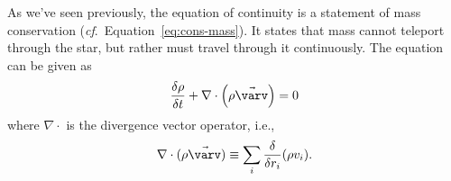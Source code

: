 \begin{description}
    \setlength{\itemindent}{0pt}
    \item[The continuity equation.]
    As we've seen previously, the equation of continuity is a statement of mass conservation (\emph{cf}.~Equation~\ref{eq:cons-mass}). 
    It states that mass cannot teleport through the star, but rather must travel through it continuously. 
    The equation can be given as 
    \begin{equation} \label{eq:continuity} 
        \frac{\delta \rho}{\delta t}
        +
        \nabla
        \cdot
        \left(
            \rho \vec{\varv} 
        \right)
        =
        0
    \end{equation}
    where $\nabla\cdot$ is the divergence vector operator, i.e., %
    \begin{equation}
        \nabla\cdot(\rho \vec{\varv})
        \equiv
        \sum_i \frac{\delta}{\delta r_i} (\rho v_i).
    \end{equation}

    

\end{description}
